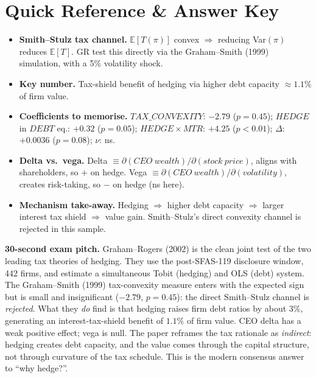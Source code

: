 \documentclass[11pt]{article}
\newcommand{\EV}{\mathbb{E}}
\begin{document}
\section*{Quick Reference \& Answer Key}
\begin{answerbox}
\begin{itemize}
\item \textbf{Smith--Stulz tax channel.} $\EV[T(\pi)]$ convex $\Rightarrow$ reducing Var$(\pi)$ reduces $\EV[T]$. GR test this directly via the Graham--Smith (1999) simulation, with a 5\% volatility shock.
\item \textbf{Key number.} Tax-shield benefit of hedging via higher debt capacity $\approx 1.1\%$ of firm value.
\item \textbf{Coefficients to memorise.} $TAX\_CONVEXITY$: $-2.79$ ($p=0.45$); $HEDGE$ in $DEBT$ eq.: $+0.32$ ($p=0.05$); $HEDGE\times MTR$: $+4.25$ ($p<0.01$); $\Delta$: $+0.0036$ ($p=0.08$); $\nu$: ns.
\item \textbf{Delta vs.\ vega.} Delta $\equiv \partial(CEO~wealth)/\partial(stock~price)$, aligns with shareholders, so $+$ on hedge. Vega $\equiv \partial(CEO~wealth)/\partial(volatility)$, creates risk-taking, so $-$ on hedge (ns here).
\item \textbf{Mechanism take-away.} Hedging $\Rightarrow$ higher debt capacity $\Rightarrow$ larger interest tax shield $\Rightarrow$ value gain. Smith--Stulz's direct convexity channel is rejected in this sample.
\end{itemize}
\end{answerbox}

\begin{keybox}
\textbf{30-second exam pitch.} Graham--Rogers (2002) is the clean joint test of the two leading tax theories of hedging. They use the post-SFAS-119 disclosure window, 442 firms, and estimate a simultaneous Tobit (hedging) and OLS (debt) system. The Graham--Smith (1999) tax-convexity measure enters with the expected sign but is small and insignificant ($-2.79$, $p=0.45$): the direct Smith--Stulz channel is \emph{rejected}. What they \emph{do} find is that hedging raises firm debt ratios by about 3\%, generating an interest-tax-shield benefit of $1.1\%$ of firm value. CEO delta has a weak positive effect; vega is null. The paper reframes the tax rationale as \emph{indirect}: hedging creates debt capacity, and the value comes through the capital structure, not through curvature of the tax schedule. This is the modern consensus answer to ``why hedge?''.
\end{keybox}
\end{document}
